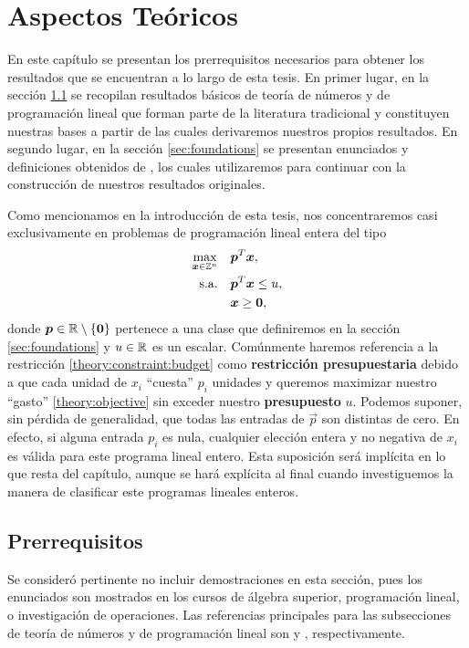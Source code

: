 \chapter{Aspectos Teóricos}
\noindent
En este capítulo se presentan los prerrequisitos necesarios para obtener los resultados que se
encuentran a lo largo de esta tesis. En primer lugar, en la sección \ref{sec:prerreq} se recopilan
resultados básicos de teoría de números y de programación lineal que forman parte de la literatura
tradicional y constituyen nuestras bases a partir de las cuales derivaremos nuestros propios
resultados. En segundo lugar, en la sección \ref{sec:foundations} se presentan enunciados y definiciones
obtenidos de \cite{herr}, los cuales utilizaremos para continuar con la construcción de nuestros
resultados originales.

Como mencionamos en la introducción de esta tesis, nos concentraremos casi exclusivamente en problemas
de programación lineal entera del tipo
\begin{subequations}
	\label{theory:formulation}
	\begin{align}
		\max_{\boldsymbol{x} \in \mathbb{Z}^n} \quad
			& \boldsymbol{p}^T\boldsymbol{x}, \label{theory:objective} \\
		\text{s.a.} \quad
			& \boldsymbol{p}^T\boldsymbol{x} \leq u, \label{theory:constraint:budget} \\
			& \boldsymbol{x} \geq \boldsymbol{0}, \nonumber
	\end{align}
\end{subequations}
donde $\boldsymbol{p}\in\mathbb{R}\setminus\lbrace \boldsymbol{0} \rbrace$ pertenece a una clase que definiremos en la sección
\ref{sec:foundations} y $u \in \mathbb{R}$ es un escalar. Comúnmente haremos referencia a la restricción
\eqref{theory:constraint:budget} como \textbf{restricción presupuestaria} debido a que cada unidad
de $x_i$ ``cuesta'' $p_i$ unidades y queremos maximizar nuestro ``gasto''
\eqref{theory:objective} sin exceder nuestro \textbf{presupuesto} $u$. Podemos suponer, sin pérdida
de generalidad, que todas las entradas de $\vec{p}$ son distintas de cero. En efecto, si alguna
entrada $p_i$ es nula, cualquier elección entera y no negativa de $x_i$ es válida para este programa
lineal entero. Esta suposición será implícita en lo que resta del capítulo, aunque se hará explícita
al final cuando investiguemos la manera de clasificar este programas lineales enteros.

\section{Prerrequisitos}
\label{sec:prerreq}
\noindent
Se consideró pertinente no incluir demostraciones en esta sección, pues los enunciados son
mostrados en los cursos de álgebra superior, programación lineal, o investigación de
operaciones. Las referencias principales para las subsecciones de teoría de números y de
programación lineal son \cite{carmen} y \cite{fabs}, respectivamente.

